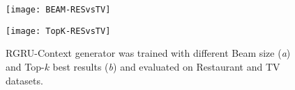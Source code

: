 \documentclass{llncs}
\begin{document}
\begin{figure}
	\centering
    \begin{minipage}{0.5\textwidth}
      \centering
      \texttt{[image: BEAM-RESvsTV]}
      \label{fig:BEAM-RESvsTV}
	\end{minipage}\hfill
    \begin{minipage}{0.5\textwidth}
      \centering
      \texttt{[image: TopK-RESvsTV]}
      \label{fig:TopK_RESvsTV} 
    \end{minipage}
\caption{RGRU-Context generator was trained with different Beam size (\textit{a}) and Top-$k$ best results (\textit{b}) and evaluated on Restaurant and TV datasets.}   
\label{fig:BEAM-TopK-RESvsTV}
\end{figure}
\end{document}

